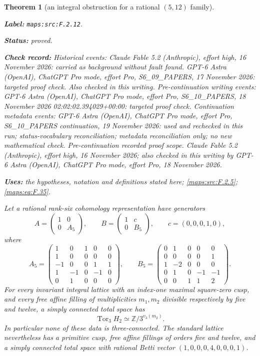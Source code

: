 \documentclass[11pt,a4paper]{article}
\newtheorem{theorem}{Theorem}[section]
\theoremstyle{definition}
\newcommand{\StatementRecord}[4]{\par\smallskip\begingroup\upshape\raggedright\noindent\textbf{Label:} \nolinkurl{#1}.\par\noindent\textbf{Status:} #2.\par\noindent\textbf{Check record:} #3.\par\noindent\textbf{Uses:} #4.\par\endgroup\smallskip}
\begin{document}
\begin{theorem}[an integral obstruction for a rational $(5,12)$ family]\label{maps:src:F.2.12}
\StatementRecord{maps:src:F.2.12}{proved}{Historical events: Claude Fable 5.2 (Anthropic), effort high, 16 November 2026: carried as background without fault found. GPT-6 Astra (OpenAI), ChatGPT Pro mode, effort Pro, S6\_09\_PAPERS, 17 November 2026: targeted proof check. Also checked in this writing. Pre-continuation writing events: GPT-6 Astra (OpenAI), ChatGPT Pro mode, effort Pro, S6\_10\_PAPERS, 18 November 2026 02:02:02.394029+00:00: targeted proof check. Continuation metadata events: GPT-6 Astra (OpenAI), ChatGPT Pro mode, effort Pro, S6\_10\_PAPERS continuation, 19 November 2026: used and rechecked in this run; status-vocabulary reconciliation; metadata reconciliation only; no new mathematical check. \emph{Pre-continuation recorded proof scope.} Claude Fable 5.2 (Anthropic), effort high, 16 November 2026; also checked in this writing by GPT-6 Astra (OpenAI), ChatGPT Pro mode, effort Pro, 18 November 2026}{the hypotheses, notation and definitions stated here; \cref{maps:src:F.2.5}; \cref{maps:eq:F.35}}


Let a rational rank-six cohomology representation have generators
\[
 A=\begin{pmatrix}1&0\\0&A_5\end{pmatrix},\qquad
 B=\begin{pmatrix}1&c\\0&B_5\end{pmatrix},\qquad
 c=(0,0,0,1,0),
\]
where
\[
 A_5=\begin{pmatrix}
 1&0&1&0&0\\1&0&0&0&0\\-1&0&0&1&1\\
 1&-1&0&-1&0\\0&1&0&0&0
 \end{pmatrix},\qquad
 B_5=\begin{pmatrix}
 0&1&0&0&0\\0&0&0&0&1\\1&-2&0&0&0\\
 0&1&0&-1&-1\\0&0&1&1&2
 \end{pmatrix}.
 \tag{F.33}\label{maps:eq:F.33}
\]
For every invariant integral lattice with an index-one maximal
square-zero cusp, and every free affine filling of multiplicities
$m_1,m_2$ divisible respectively by five and twelve, a simply
connected total space has
\[
 \operatorname{Tor}_3 H_2
       \simeq\mathbb Z/3^{v_3(m_2)}.
 \tag{F.34}\label{maps:eq:F.34}
\]
In particular none of these data is three-connected.
The standard lattice nevertheless has a primitive cusp,
free affine fillings of orders five and twelve, and a simply
connected total space with rational Betti vector
$(1,0,0,0,4,0,0,0,1)$.

\end{theorem}
\end{document}
